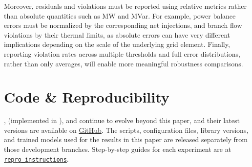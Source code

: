 Moreover, residuals and violations must be reported using relative metrics rather than absolute quantities such as MW and MVar. For example, power balance errors must be normalized by the corresponding net injections, and branch flow violations by their thermal limits, as absolute errors can have very different implications depending on the scale of the underlying grid element. Finally, reporting violation rates across multiple thresholds and full error distributions, rather than only averages, will enable more meaningful robustness comparisons.

\section{Code \& Reproducibility}

\graphkit, \genco (implemented in \graphkit), and \datakit continue to evolve beyond this paper, and their latest versions are available on \href{https://github.com/gridfm}{GitHub}. The scripts, configuration files, library versions, and trained models used for the results in this paper are released separately from those development branches. Step-by-step guides for each experiment are at \href{https://github.com/gridfm/gridfm-paper-genco/tree/main/repro_instructions}{\texttt{repro\_instructions}}.
